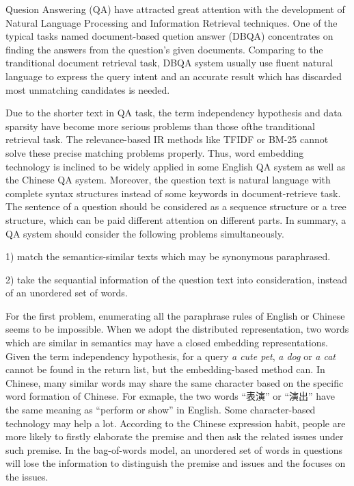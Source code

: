 \documentclass{llncs}
\begin{document}
Quesion Answering (QA) have {\color{red} attracted great}  attention with the development of Natural Language Processing and Information Retrieval techniques. One of the typical tasks named document-based quetion answer (DBQA) concentrates on finding the answers from the question's given documents.
Comparing to the tranditional document retrieval task, DBQA system usually use fluent natural language to express the query intent and  {\color{red}an} accurate result  {\color{red}which has discarded most} unmatching candidates is needed. 

Due to the shorter text in QA task, the term independency hypothesis and data sparsity  {\color{red}have become} more serious problems than  {\color{red}those of}the tranditional retrieval task. The relevance-based IR methods like TFIDF or BM-25 cannot solve  {\color{red}these} precise matching problems {\color{red}properly}. Thus, word embedding technology \cite{Mikolov2013Efficient} is  {\color{red}inclined} to  {\color{red}be} widely applied in some English QA system as well as the Chinese QA system. Moreover, the question text is natural language with complete syntax structures instead of some keywords in document-retrieve task. The sentence of a question should be considered as a sequence structure or a tree structure, which can {\color{red}be paid} different attention on different parts. In summary, a QA system should consider {\color{red}the following} problems simultaneously.

1) match the semantics-similar texts which may be synonymous paraphrased.  

2) take the sequantial information of the question text into consideration, instead of an unordered set of words.

For the first problem, enumerating all the paraphrase rules of English or Chinese seems to be impossible. When we adopt the distributed representation, two words which {\color{red}are} similar in semantics may have a closed embedding representations. {\color{red}Given} the term independency hypothesis, for a query \emph{a cute pet}, \emph{a dog} or \emph{a cat} cannot be found in the return list, but the embedding-based method can. In Chinese, many similar words may share the same character based on the specific word formation of Chinese. For exmaple, the two words ``表演'' or ``演出'' have the same meaning as ``perform or show'' in English. Some character-based technology may help a lot.  
{\color{red}According to} the Chinese expression habit, people are more likely to firstly elaborate the premise and then ask the related issues under such premise. In the bag-of-words model, an unordered set of words in questions will lose the information to distinguish the premise and issues and {\color{red}the focuses} on the issues.
\end{document}

